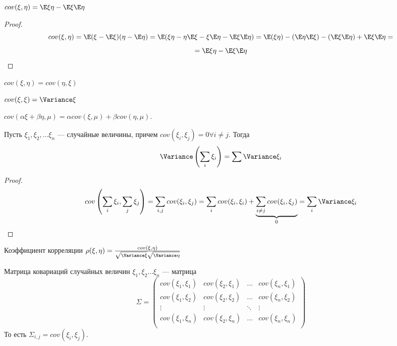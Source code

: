\begin{proposition}
    \(cov(\xi, \eta) = \E\xi\eta - \E\xi\E\eta\)
\end{proposition}
\begin{proof}
    \[cov(\xi, \eta) = \E(\xi - \E\xi)(\eta - \E\eta) = \E(\xi\eta - \eta\E\xi - \xi\E\eta - \E\xi\E\eta) = \E(\xi\eta) - (\E\eta\E\xi) - (\E\xi\E\eta) + \E\xi\E\eta =\]
    \[= \E\xi\eta - \E\xi\E\eta\]
\end{proof}
\begin{note}
    \(cov(\xi, \eta) = cov(\eta, \xi)\)
\end{note}
\begin{note}
    \(cov(\xi, \xi) = \Variance \xi\)
\end{note}
\begin{note}
    \(cov(\alpha\xi + \beta\eta, \mu) = \alpha cov(\xi, \mu) + \beta cov(\eta, \mu)\).
\end{note}

\begin{proposition}
    Пусть \(\xi_1, \xi_2, \dots \xi_n\) --- случайные величины, причем \(cov(\xi_i, \xi_j) = 0 \forall i \ne j\). Тогда 
    \[\Variance\left(\sum_i \xi_i\right) = \sum \Variance \xi_i\]
\end{proposition}
\begin{proof}
    \[cov\left(\sum_i \xi_i, \sum_j \xi_j\right) = \sum_{i, j} cov(\xi_i, \xi_j) = \sum_i cov(\xi_i, \xi_i) + \underbrace{\sum_{i \ne j} cov(\xi_i, \xi_j)}_{0} = \sum_i \Variance \xi_i\]
\end{proof}

\begin{definition}
    Коэффициент корреляции \(\rho(\xi, \eta) = \frac{cov(\xi, \eta)}{\sqrt{\Variance \xi}\sqrt{\Variance \eta}}\)
\end{definition}

\begin{definition}
    Матрица ковариаций случайных величин \(\xi_1, \xi_2 \dots \xi_n\) --- матрица
    \[\Sigma = \left(\begin{array}{cccc}
        cov(\xi_1, \xi_1) & cov(\xi_2, \xi_1) & \dots & cov(\xi_n, \xi_1) \\
        cov(\xi_1, \xi_2) & cov(\xi_2, \xi_2) & \dots & cov(\xi_n, \xi_2) \\
        \vdots & \vdots & \ddots & \vdots \\
        cov(\xi_1, \xi_n) & cov(\xi_2, \xi_n) & \dots & cov(\xi_n, \xi_n) \\
    \end{array}\right)\]
    То есть \(\Sigma_{i, j} = cov(\xi_i, \xi_j)\).
\end{definition}

